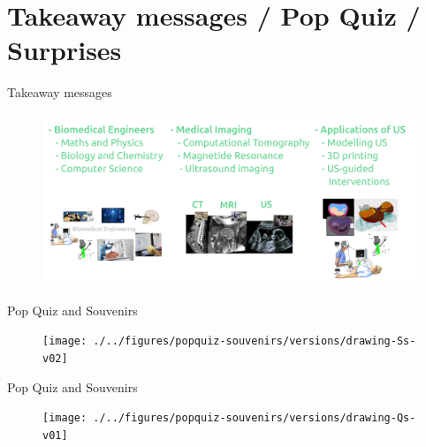 \section{Takeaway messages / Pop Quiz / Surprises }



{
\begin{frame}{Takeaway messages}
  \begin{figure}
  \centering
  \includegraphics[width=1.0\textwidth]{./../figures/takeaways/versions/drawing-v04}
  \end{figure}

\end{frame}
}

{
\begin{frame}{Pop Quiz and Souvenirs}
  \begin{figure}
  \centering
  \texttt{[image: ./../figures/popquiz-souvenirs/versions/drawing-Ss-v02]}
  \end{figure}

\end{frame}
}


{
\begin{frame}{Pop Quiz and Souvenirs}
  \begin{figure}
  \centering
  \texttt{[image: ./../figures/popquiz-souvenirs/versions/drawing-Qs-v01]}
  \end{figure}

\end{frame}
}



